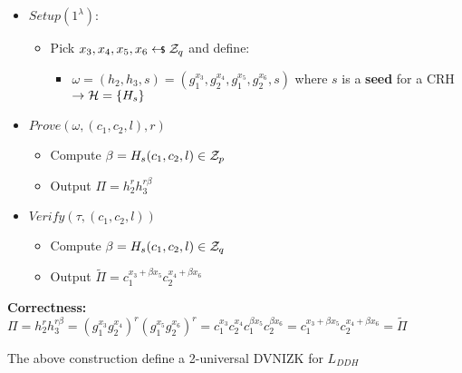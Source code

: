 \begin{itemize}
    \item $Setup(1^\lambda)$: \begin{itemize}
        \item Pick $x_3,x_4,x_5,x_6 \pickUAR \Z_q$ and define:
        \begin{itemize}
            \item $\omega=(h_2,h_3,s)=(g_1^{x_3},g_2^{x_4},g_1^{x_5},g_2^{x_6},s)$ where $s$ is a \textbf{seed} for a CRH$\rightarrow \mathcal{H}=\{H_s\}$ %
        \end{itemize}
    \end{itemize}
    \item $Prove(\omega, (c_1,c_2,l), r)$ \begin{itemize}
        \item Compute $\beta=H_s(c_1,c_2,l)\in \mathcal{Z}_p$
        \item Output $\Pi=h_2^rh_3^{r\beta}$
    \end{itemize}
    \item $Verify(\tau, (c_1,c_2,l))$\begin{itemize}
        \item Compute $\beta=H_s(c_1,c_2,l)\in \mathcal{Z}_q$
        \item Output $\widetilde{\Pi}=c_1^{x_3+\beta x_5}c_2^{x_4+\beta x_6}$
    \end{itemize}
\end{itemize}

\noindent\textbf{Correctness:}\\ $\Pi=h_2^rh_3^{r\beta}=(g_1^{x_3}g_2^{x_4})^r(g_1^{x_5}g_2^{x_6})^r=c_1^{x_3}c_2^{x_4}c_1^{\beta x_5}c_2^{\beta x_6}=c_1^{x_3+\beta x_5}c_2^{x_4+\beta x_6}=\widetilde{\Pi}$

\begin{theorem}
    The above construction define a 2-universal DVNIZK for $L_{DDH}$    
\end{theorem}


